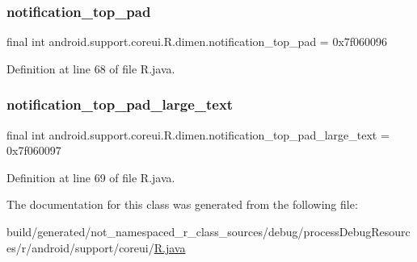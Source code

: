 \subsubsection{\texorpdfstring{notification\_top\_pad}{notification\_top\_pad}}
{\footnotesize\ttfamily final int android.\+support.\+coreui.\+R.\+dimen.\+notification\+\_\+top\+\_\+pad = 0x7f060096\hspace{0.3cm}{\ttfamily [static]}}



Definition at line 68 of file R.\+java.

\mbox{\label{classandroid_1_1support_1_1coreui_1_1_r_1_1dimen_ae54b3572dbe6c64903907da04f41c7a2}} 
\subsubsection{\texorpdfstring{notification\_top\_pad\_large\_text}{notification\_top\_pad\_large\_text}}
{\footnotesize\ttfamily final int android.\+support.\+coreui.\+R.\+dimen.\+notification\+\_\+top\+\_\+pad\+\_\+large\+\_\+text = 0x7f060097\hspace{0.3cm}{\ttfamily [static]}}



Definition at line 69 of file R.\+java.



The documentation for this class was generated from the following file\+:\begin{DoxyCompactItemize}
\item 
build/generated/not\+\_\+namespaced\+\_\+r\+\_\+class\+\_\+sources/debug/process\+Debug\+Resources/r/android/support/coreui/\mbox{\hyperlink{android_2support_2coreui_2_r_8java}{R.\+java}}\end{DoxyCompactItemize}
